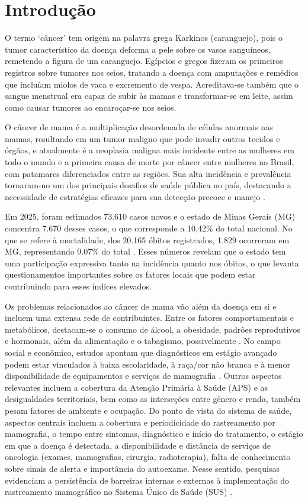 \chapter{Introdução}

O termo ‘câncer’ tem origem na palavra grega Karkinos (caranguejo), pois o tumor característico da doença deforma a pele sobre os vasos sanguíneos, remetendo a figura de um caranguejo.
Egípcios e gregos fizeram os primeiros registros sobre tumores nos seios, tratando a doença com amputações e remédios que incluíam miolos de vaca e excremento de vespa.
Acreditava-se também que o sangue menstrual era capaz de subir às mamas e transformar-se em leite, assim como causar tumores ao encaroçar-se nos seios.\cite{inca2018mulher}

O câncer de mama é a multiplicação desordenada de células anormais nas mamas, resultando em um tumor maligno que pode invadir outros tecidos e órgãos, e atualmente é a neoplasia maligna mais incidente entre as mulheres em todo o mundo e a primeira causa de morte por câncer entre mulheres no Brasil, com patamares diferenciados entre as regiões. \cite{ms2026cancermama} Sua alta incidência e prevalência tornaram-no um dos principais desafios de saúde pública no país, destacando a necessidade de estratégias eficazes para sua detecção precoce e manejo \cite{Pinheiro2024}.

Em 2025, foram estimados 73.610 casos novos e o estado de Minas Gerais (MG) concentra 7.670 desses casos, o que corresponde a 10,42\% do total nacional. No que se refere à mortalidade, dos 20.165 óbitos registrados, 1.829 ocorreram em MG, representando 9.07\% do total \cite{Inca2024}. Esses números revelam que o estado tem uma participação expressiva tanto na incidência quanto nos óbitos, o que levanta questionamentos importantes sobre os fatores locais que podem estar contribuindo para esses índices elevados. 

Os problemas relacionados ao câncer de mama vão além da doença em si e incluem uma extensa rede de contribuintes. Entre os fatores comportamentais e metabólicos, destacam-se o consumo de álcool, a obesidade, padrões reprodutivos e hormonais, além da alimentação e o tabagismo, possivelmente \cite{Alves2022}. No campo social e econômico, estudos apontam que diagnósticos em estágio avançado podem estar vinculados à baixa escolaridade, à raça/cor não branca e à menor disponibilidade de equipamentos e serviços de mamografia \cite{Dantas2021}. Outros aspectos relevantes incluem a cobertura da Atenção Primária à Saúde (APS) e as desigualdades territoriais, bem como as interseções entre gênero e renda, também pesam fatores de ambiente e ocupação. Do ponto de vista do sistema de saúde, aspectos centrais incluem a cobertura e periodicidade do rastreamento por mamografia, o tempo entre sintomas, diagnóstico e início do tratamento, o estágio em que a doença é detectada, a disponibilidade e distância de serviços de oncologia (exames, mamografias, cirurgia, radioterapia), falta de conhecimento sobre sinais de alerta e importância do autoexame. Nesse sentido,  pesquisas evidenciam a persistência de barreiras internas e externas à implementação do rastreamento mamográfico no Sistema Único de Saúde (SUS) \cite{Sala2025}. 

